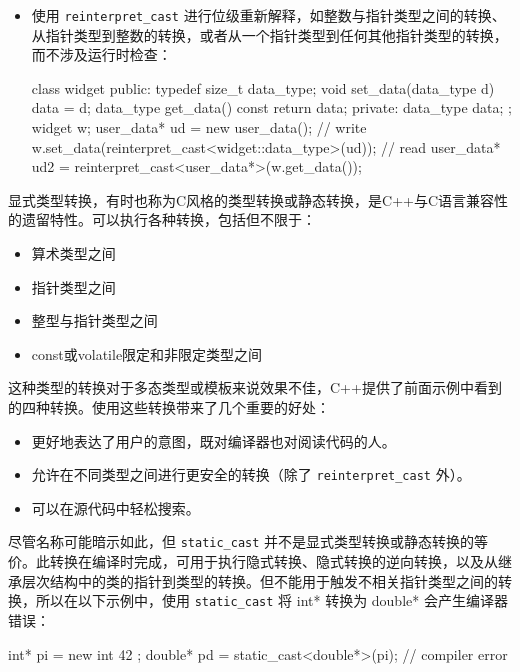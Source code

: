 \begin{itemize}
\item
使用 \verb|reinterpret_cast| 进行位级重新解释，如整数与指针类型之间的转换、从指针类型到整数的转换，或者从一个指针类型到任何其他指针类型的转换，而不涉及运行时检查：

\begin{cpp}
class widget
{
public:
    typedef size_t data_type;
    void set_data(data_type d) { data = d; }
    data_type get_data() const { return data; }
private:
    data_type data;
};
widget w;
user_data* ud = new user_data();
// write
w.set_data(reinterpret_cast<widget::data_type>(ud));
// read
user_data* ud2 = reinterpret_cast<user_data*>(w.get_data());
\end{cpp}
\end{itemize}


显式类型转换，有时也称为C风格的类型转换或静态转换，是C++与C语言兼容性的遗留特性。可以执行各种转换，包括但不限于：

\begin{itemize}
\item
算术类型之间

\item
指针类型之间

\item
整型与指针类型之间

\item
const或volatile限定和非限定类型之间
\end{itemize}

这种类型的转换对于多态类型或模板来说效果不佳，C++提供了前面示例中看到的四种转换。使用这些转换带来了几个重要的好处：

\begin{itemize}
\item
更好地表达了用户的意图，既对编译器也对阅读代码的人。

\item
允许在不同类型之间进行更安全的转换（除了 \verb|reinterpret_cast| 外）。

\item
可以在源代码中轻松搜索。
\end{itemize}

尽管名称可能暗示如此，但 \verb|static_cast| 并不是显式类型转换或静态转换的等价。此转换在编译时完成，可用于执行隐式转换、隐式转换的逆向转换，以及从继承层次结构中的类的指针到类型的转换。但不能用于触发不相关指针类型之间的转换，所以在以下示例中，使用 \verb|static_cast| 将 int* 转换为 double* 会产生编译器错误：

\begin{cpp}
int* pi = new int{ 42 };
double* pd = static_cast<double*>(pi);   // compiler error
\end{cpp}

